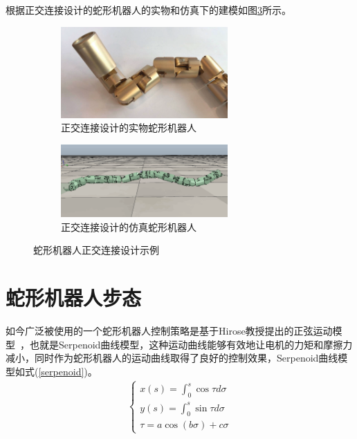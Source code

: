根据正交连接设计的蛇形机器人的实物和仿真下的建模如图\ref{fig:snakeexample}所示。
\begin{figure}[h!] %
	\begin{subfigure}{0.5\textwidth}
		\centering
		\includegraphics[width=0.7\textwidth,height=0.15\textheight]{figure/chap03/realSnake.eps}
		\caption{正交连接设计的实物蛇形机器人}
		\label{fig:realSnake}
	\end{subfigure}
	\begin{subfigure}{0.5\textwidth}
		\centering
		\includegraphics[width=0.7\textwidth,height=0.15\textheight]{figure/chap03/simulateSnake.eps}
		\caption{正交连接设计的仿真蛇形机器人}
		\label{fig:simulateSnake}
	\end{subfigure}
	\caption{蛇形机器人正交连接设计示例}
	\label{fig:snakeexample}
\end{figure}


\section{蛇形机器人步态}
如今广泛被使用的一个蛇形机器人控制策略是基于Hirose教授提出的正弦运动模型~\cite{HiroseSine}，也就是Serpenoid曲线模型，这种运动曲线能够有效地让电机的力矩和摩擦力减小，同时作为蛇形机器人的运动曲线取得了良好的控制效果，Serpenoid曲线模型如式(\ref{serpenoid})。
\begin{eqnarray}\label{serpenoid}
\left\{
\begin{array}{lr}
x(s)=\int_{0}^{s}\cos \tau d\sigma \\
y(s)=\int_{0}^{s}\sin \tau d\sigma \\
\tau =a\cos(b\sigma )+c\sigma
\end{array}
\right.
\end{eqnarray}

